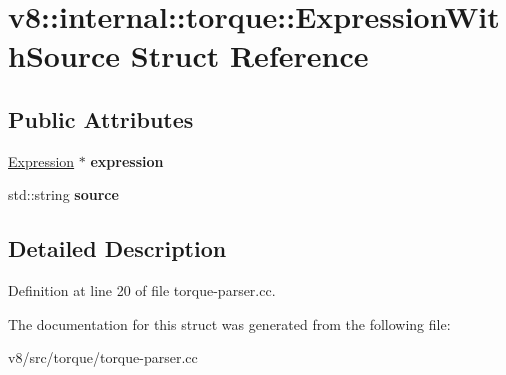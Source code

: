 \hypertarget{structv8_1_1internal_1_1torque_1_1ExpressionWithSource}{}\section{v8\+:\+:internal\+:\+:torque\+:\+:Expression\+With\+Source Struct Reference}
\label{structv8_1_1internal_1_1torque_1_1ExpressionWithSource}
\subsection*{Public Attributes}
\begin{DoxyCompactItemize}
\item 
\mbox{\label{structv8_1_1internal_1_1torque_1_1ExpressionWithSource_aee490691aa2dec50f993525a7ece7813}} 
\mbox{\hyperlink{structv8_1_1internal_1_1torque_1_1Expression}{Expression}} $\ast$ {\bfseries expression}
\item 
\mbox{\label{structv8_1_1internal_1_1torque_1_1ExpressionWithSource_a0abf937cf080373a89255e099944da75}} 
std\+::string {\bfseries source}
\end{DoxyCompactItemize}


\subsection{Detailed Description}


Definition at line 20 of file torque-\/parser.\+cc.



The documentation for this struct was generated from the following file\+:\begin{DoxyCompactItemize}
\item 
v8/src/torque/torque-\/parser.\+cc\end{DoxyCompactItemize}
